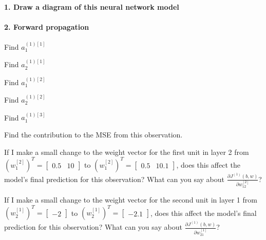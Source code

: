 \documentclass[]{extarticle}
\let\oldparagraph\paragraph
\renewcommand{\paragraph}[1]{\oldparagraph{#1}\mbox{}}
\begin{document}
\hypertarget{draw-a-diagram-of-this-neural-network-model}{%
\paragraph{1. Draw a diagram of this neural network
model}\label{draw-a-diagram-of-this-neural-network-model}}

\vspace{3cm}

\hypertarget{forward-propagation}{%
\paragraph{2. Forward propagation}\label{forward-propagation}}

Find \(a^{(1)[1]}_1\)

\vspace{0.75cm}

Find \(a^{(1)[1]}_2\)

\vspace{0.75cm}

Find \(a^{(1)[2]}_1\)

\vspace{0.75cm}

Find \(a^{(1)[2]}_2\)

\vspace{0.75cm}

Find \(a^{(1)[3]}_1\)

\vspace{0.75cm}

Find the contribution to the MSE from this observation.

\newpage

If I make a small change to the weight vector for the first unit in
layer 2 from
\(\left(w^{[2]}_1\right)^T = \begin{bmatrix}0.5 & 10 \end{bmatrix}\) to
\(\left(w^{[2]}_1\right)^T = \begin{bmatrix}0.5 & 10.1 \end{bmatrix}\),
does this affect the model's final prediction for this observation? What
can you say about
\(\frac{\partial J^{(1)}(b, w)}{\partial w^{[2]}_{12}}\)?

\vspace{3cm}

If I make a small change to the weight vector for the second unit in
layer 1 from
\(\left(w^{[1]}_2\right)^T = \begin{bmatrix}-2\end{bmatrix}\) to
\(\left(w^{[1]}_2\right)^T = \begin{bmatrix}-2.1\end{bmatrix}\), does
this affect the model's final prediction for this observation? What can
you say about \(\frac{\partial J^{(1)}(b, w)}{\partial w^{[1]}_{21}}\)?
\end{document}
